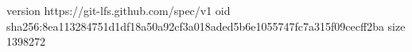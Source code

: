 version https://git-lfs.github.com/spec/v1
oid sha256:8ea113284751d1df18a50a92cf3a018aded5b6e1055747fc7a315f09cecff2ba
size 1398272

